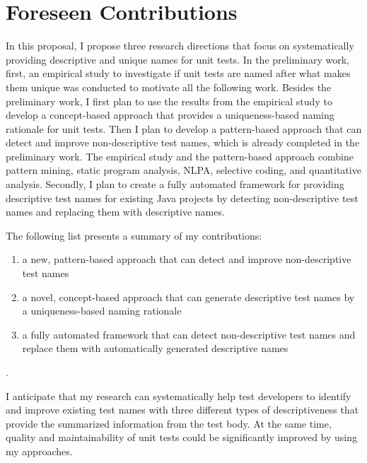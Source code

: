 \section{Foreseen Contributions}
\label{sec:contributions}

In this proposal, I propose three research directions that focus on systematically providing descriptive and unique names for unit tests.
%
In the preliminary work, first, an empirical study to investigate if unit tests are named after what makes them unique was conducted to motivate all the following work.
%
Besides the preliminary work, I first plan to use the results from the empirical study to develop a concept-based approach that provides a uniqueness-based naming rationale for unit tests.
%
Then I plan to develop a pattern-based approach that can detect and improve non-descriptive test names, which is already completed in the preliminary work.
%
The empirical study and the pattern-based approach combine pattern mining, static program analysis, NLPA, selective coding, and quantitative analysis.
%
Secondly, I plan to create a fully automated framework for providing descriptive test names for existing Java projects by detecting non-descriptive test names and replacing them with descriptive names.

The following list presents a summary of my contributions:
\begin{enumerate}
    \item a new, pattern-based approach that can detect and improve non-descriptive test names
    \item a novel, concept-based approach that can generate descriptive test names by a uniqueness-based naming rationale
    \item a fully automated framework that can detect non-descriptive test names and replace them with automatically generated descriptive names
\end{enumerate}.

I anticipate that my research can systematically help test developers to identify and improve existing test names with three different types of descriptiveness that provide the summarized information from the test body.
%
At the same time, quality and maintainability of unit tests could be significantly improved by using my approaches.